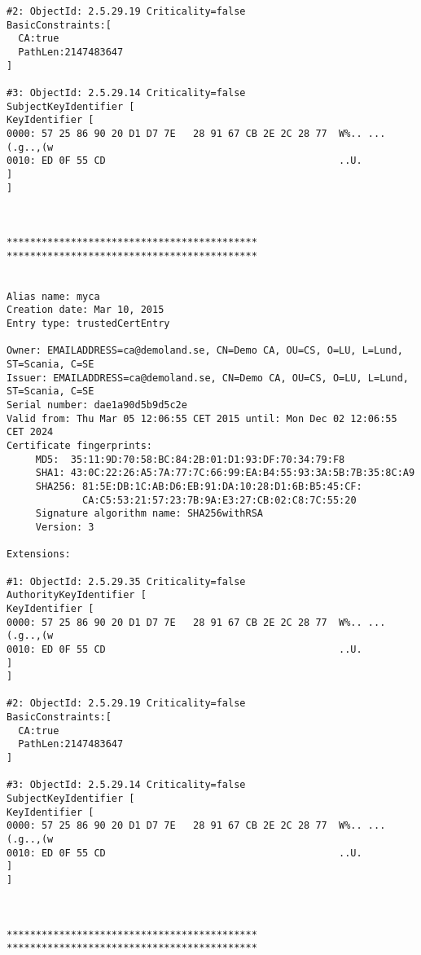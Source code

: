 \documentclass[11pt,a4paper]{article}
\begin{document}
\begin{verbatim}
#2: ObjectId: 2.5.29.19 Criticality=false
BasicConstraints:[
  CA:true
  PathLen:2147483647
]

#3: ObjectId: 2.5.29.14 Criticality=false
SubjectKeyIdentifier [
KeyIdentifier [
0000: 57 25 86 90 20 D1 D7 7E   28 91 67 CB 2E 2C 28 77  W%.. ...(.g..,(w
0010: ED 0F 55 CD                                        ..U.
]
]



*******************************************
*******************************************


Alias name: myca
Creation date: Mar 10, 2015
Entry type: trustedCertEntry

Owner: EMAILADDRESS=ca@demoland.se, CN=Demo CA, OU=CS, O=LU, L=Lund, ST=Scania, C=SE
Issuer: EMAILADDRESS=ca@demoland.se, CN=Demo CA, OU=CS, O=LU, L=Lund, ST=Scania, C=SE
Serial number: dae1a90d5b9d5c2e
Valid from: Thu Mar 05 12:06:55 CET 2015 until: Mon Dec 02 12:06:55 CET 2024
Certificate fingerprints:
	 MD5:  35:11:9D:70:58:BC:84:2B:01:D1:93:DF:70:34:79:F8
	 SHA1: 43:0C:22:26:A5:7A:77:7C:66:99:EA:B4:55:93:3A:5B:7B:35:8C:A9
	 SHA256: 81:5E:DB:1C:AB:D6:EB:91:DA:10:28:D1:6B:B5:45:CF:
	         CA:C5:53:21:57:23:7B:9A:E3:27:CB:02:C8:7C:55:20
	 Signature algorithm name: SHA256withRSA
	 Version: 3

Extensions: 

#1: ObjectId: 2.5.29.35 Criticality=false
AuthorityKeyIdentifier [
KeyIdentifier [
0000: 57 25 86 90 20 D1 D7 7E   28 91 67 CB 2E 2C 28 77  W%.. ...(.g..,(w
0010: ED 0F 55 CD                                        ..U.
]
]

#2: ObjectId: 2.5.29.19 Criticality=false
BasicConstraints:[
  CA:true
  PathLen:2147483647
]

#3: ObjectId: 2.5.29.14 Criticality=false
SubjectKeyIdentifier [
KeyIdentifier [
0000: 57 25 86 90 20 D1 D7 7E   28 91 67 CB 2E 2C 28 77  W%.. ...(.g..,(w
0010: ED 0F 55 CD                                        ..U.
]
]



*******************************************
*******************************************
\end{verbatim}
\end{document}
